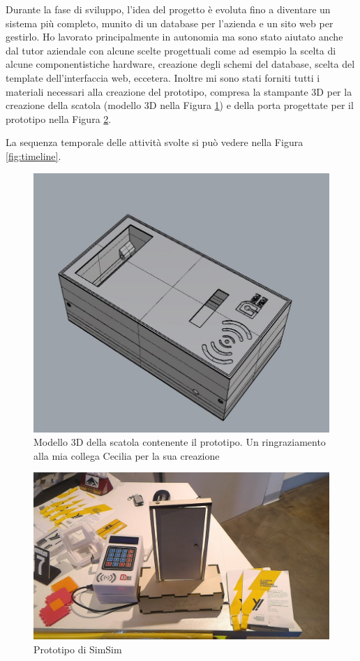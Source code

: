 \documentclass[12pt]{report}
\begin{document}
Durante la fase di sviluppo, l'idea del progetto è evoluta fino a diventare un sistema più completo, munito di un database per l'azienda e un sito web per gestirlo. Ho lavorato principalmente in autonomia ma sono stato aiutato anche dal tutor aziendale con alcune scelte progettuali come ad esempio la scelta di alcune componentistiche hardware, creazione degli schemi del database, scelta del template dell'interfaccia web, eccetera. Inoltre mi sono stati forniti tutti i materiali necessari alla creazione del prototipo, compresa la stampante 3D per la creazione della scatola (modello 3D nella Figura \ref{fig:simsim_3d}) e della porta progettate per il prototipo nella Figura \ref{fig:simsim}.

La sequenza temporale delle attività svolte si può vedere nella Figura \ref{fig:timeline}.

\pagebreak

\vspace*{50px}

\begin{figure}[H]
	\centering
	\includegraphics[width=0.5\linewidth]{./img/simsim_3d.jpeg}
	\caption{Modello 3D della scatola contenente il prototipo. Un ringraziamento alla mia collega Cecilia per la sua creazione}
	\label{fig:simsim_3d}
\end{figure}

\begin{figure}[H]
	\centering
	\includegraphics[width=0.8\linewidth]{./img/simsim.jpeg}
	\caption{Prototipo di SimSim}
	\label{fig:simsim}
\end{figure}
\end{document}
